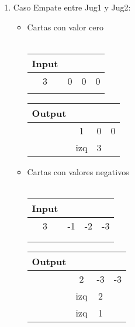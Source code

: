 \documentclass[11pt, a4paper, twoside]{article}
\begin{document}
\begin{enumerate}
  \item Caso Empate entre Jug1 y Jug2:

    \begin{itemize}
      \item Cartas con valor cero \\
      \\
        \begin{minipage}{0.4\textwidth}
            \begin{tabular}{cccc}
               Input \\
               \hline
               3 & 0 & 0 & 0 \\
               \\
            \end{tabular}
        \end{minipage} 
        \begin{minipage}{0.3\textwidth}
            \begin{tabular}{cccc}
              Output\\
              \hline
              & 1   & 0  & 0 \\
              & izq & 3  & \\
            \end{tabular}
        \end{minipage} 
        
      \item Cartas con valores negativos \\
      \\
        \begin{minipage}{0.4\textwidth}
            \begin{tabular}{cccc}
               Input\\
               \hline
               3 & -1 & -2 & -3 \\
               \\
               \\
            \end{tabular}
        \end{minipage} 
        \begin{minipage}{0.3\textwidth}
            \begin{tabular}{cccc}
              Output \\
                          \hline
                 & 2   & -3  & -3 \\
               & izq & 2  & \\
               & izq & 1  & \\
            \end{tabular}
        \end{minipage}
    \end{itemize}
    

\end{enumerate}
\end{document}
